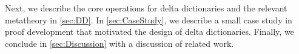 



%
%
Next, we describe the core operations for delta dictionaries and the relevant metatheory in \autoref{sec:DD}.
%
In \autoref{sec:CaseStudy}, we describe a small case study in proof development that motivated the design of delta dictionaries.
%
Finally, we conclude in \autoref{sec:Discussion} with a discussion of related work.
%


